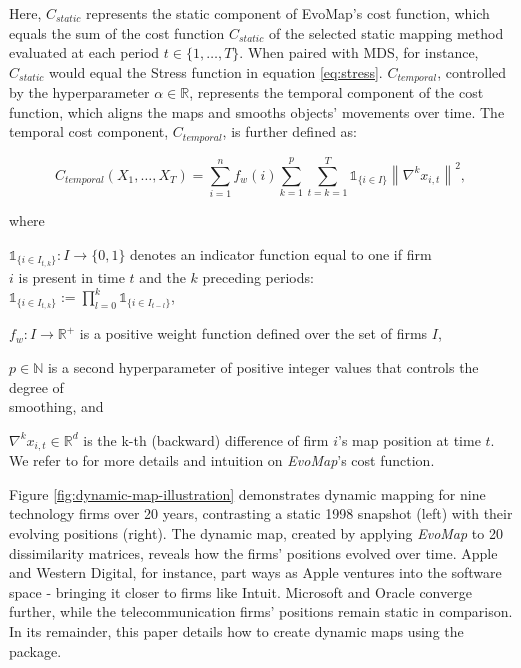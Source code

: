 \documentclass[article]{jss}
\begin{document}
Here, $C_{static}$ represents the static component of EvoMap’s cost function, which equals
the sum of the cost function $C_{static}$ of the selected static mapping method evaluated at each period
$t \in \{1, \ldots, T\}$. When paired with MDS, for instance, $C_{static}$ would equal the Stress function in
equation \ref{eq:stress}. $C_{temporal}$, controlled by the hyperparameter $\alpha \in \mathbb{R}$, represents the temporal component of the cost function, which
aligns the maps and smooths objects’ movements over time. The temporal cost component, $C_{temporal}$, is
further defined as:

\begin{equation} \label{eq:cost-temporal}
  C_{temporal}(X_1, \ldots, X_T) = \sum_{i=1}^n{f_w(i)} \sum_{k=1}^p \sum_{t=k=1}^T \mathds{1}_{\{i \in I\}} \left\| \nabla^k x_{i,t} \right\|^2,
\end{equation}

where \\
\begin{description}
  \item $\mathds{1}_{\{i \in I_{t,k}\}}: I \rightarrow \{0,1\}$ denotes an indicator function equal to one if firm \\
   $i$ is present in time $t$ and the $k$ preceding periods: \\
  $\mathds{1}_{\{i \in I_{t,k}\}} := \prod_{l=0}^k \mathds{1}_{\{i \in I_{t-l}\}}$, \\
  \item $f_w : I \rightarrow \mathbb{R}^+$ is a positive weight function defined over the set of firms $I$, \\
  \item $p \in \mathbb{N}$ is a second hyperparameter of positive integer values that controls the degree of \\ 
  smoothing, and \\
  \item $\nabla^kx_{i,t} \in \mathbb{R}^d$ is the k-th (backward) difference of firm $i$’s map position at time $t$. \\ 
  We refer to \cite{Matthe+Ringel+Skiera:2023} for more details and intuition on \emph{EvoMap}'s cost function.
\end{description}

Figure \ref{fig:dynamic-map-illustration} demonstrates dynamic mapping for nine technology firms over 20 years, 
contrasting a static 1998 snapshot (left) with their evolving positions (right). The dynamic map, 
created by applying \emph{EvoMap} to 20 dissimilarity matrices, reveals how the firms' positions evolved over time. 
Apple and Western Digital, for instance, part ways as Apple ventures into the software space - bringing it closer to firms like Intuit. 
Microsoft and Oracle converge further, while the telecommunication firms’ positions
remain static in comparison. In its remainder, this paper details how to create dynamic maps
 using the  package.
\end{document}

